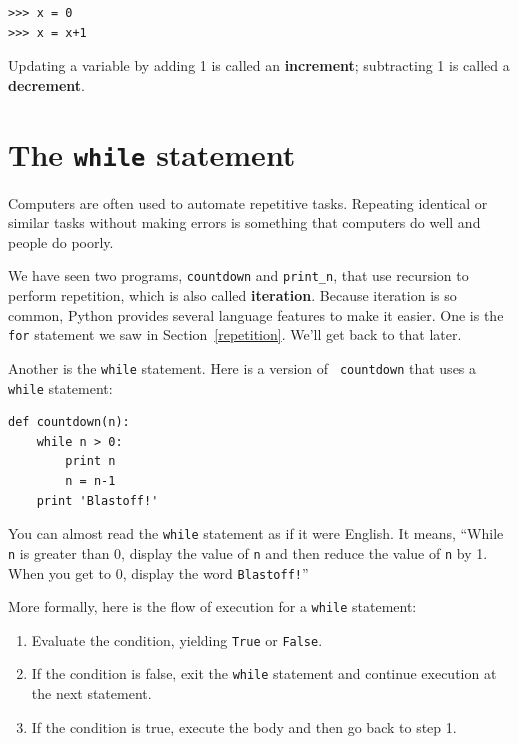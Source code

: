 \documentclass[10pt]{book}
\begin{document}
\begin{verbatim}
>>> x = 0
>>> x = x+1
\end{verbatim}
%
Updating a variable by adding 1 is called an {\bf increment};
subtracting 1 is called a {\bf decrement}.




\section{The {\tt while} statement}

Computers are often used to automate repetitive tasks.  Repeating
identical or similar tasks without making errors is something that
computers do well and people do poorly.

We have seen two programs, {\tt countdown} and \verb"print_n", that
use recursion to perform repetition, which is also called {\bf
iteration}.  Because iteration is so common, Python provides several
language features to make it easier.  One is the {\tt for} statement
we saw in Section~\ref{repetition}.  We'll get back to that later.

Another is the {\tt while} statement.  Here is a version of {\tt
countdown} that uses a {\tt while} statement:

\begin{verbatim}
def countdown(n):
    while n > 0:
        print n
        n = n-1
    print 'Blastoff!'
\end{verbatim}
%
You can almost read the {\tt while} statement as if it were English.
It means, ``While {\tt n} is greater than 0,
display the value of {\tt n} and then reduce the value of
{\tt n} by 1.  When you get to 0, display the word {\tt Blastoff!}''

More formally, here is the flow of execution for a {\tt while} statement:

\begin{enumerate}

\item Evaluate the condition, yielding {\tt True} or {\tt False}.

\item If the condition is false, exit the {\tt while} statement
and continue execution at the next statement.

\item If the condition is true, execute the
body and then go back to step 1.

\end{enumerate}
\end{document}
